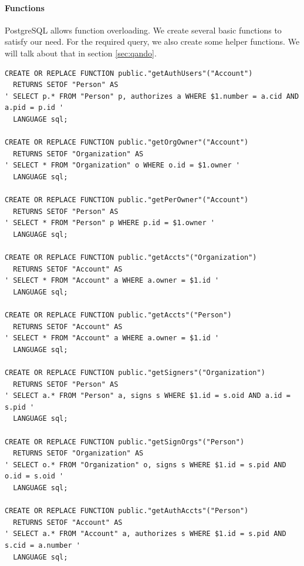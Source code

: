 \documentclass[11pt]{article}
\begin{document}
\paragraph{Functions} PostgreSQL allows function overloading. We create several basic functions to satisfy our need. For the required query, we also create some helper functions. We will talk about that in section \ref{sec:qando}.
\label{sec:functions}
\begin{verbatim}
CREATE OR REPLACE FUNCTION public."getAuthUsers"("Account")
  RETURNS SETOF "Person" AS
' SELECT p.* FROM "Person" p, authorizes a WHERE $1.number = a.cid AND a.pid = p.id '
  LANGUAGE sql;

CREATE OR REPLACE FUNCTION public."getOrgOwner"("Account")
  RETURNS SETOF "Organization" AS
' SELECT * FROM "Organization" o WHERE o.id = $1.owner '
  LANGUAGE sql;

CREATE OR REPLACE FUNCTION public."getPerOwner"("Account")
  RETURNS SETOF "Person" AS
' SELECT * FROM "Person" p WHERE p.id = $1.owner '
  LANGUAGE sql;

CREATE OR REPLACE FUNCTION public."getAccts"("Organization")
  RETURNS SETOF "Account" AS
' SELECT * FROM "Account" a WHERE a.owner = $1.id '
  LANGUAGE sql;

CREATE OR REPLACE FUNCTION public."getAccts"("Person")
  RETURNS SETOF "Account" AS
' SELECT * FROM "Account" a WHERE a.owner = $1.id '
  LANGUAGE sql;

CREATE OR REPLACE FUNCTION public."getSigners"("Organization")
  RETURNS SETOF "Person" AS
' SELECT a.* FROM "Person" a, signs s WHERE $1.id = s.oid AND a.id = s.pid '
  LANGUAGE sql;

CREATE OR REPLACE FUNCTION public."getSignOrgs"("Person")
  RETURNS SETOF "Organization" AS
' SELECT o.* FROM "Organization" o, signs s WHERE $1.id = s.pid AND o.id = s.oid '
  LANGUAGE sql;

CREATE OR REPLACE FUNCTION public."getAuthAccts"("Person")
  RETURNS SETOF "Account" AS
' SELECT a.* FROM "Account" a, authorizes s WHERE $1.id = s.pid AND s.cid = a.number '
  LANGUAGE sql;
\end{verbatim}
\end{document}
